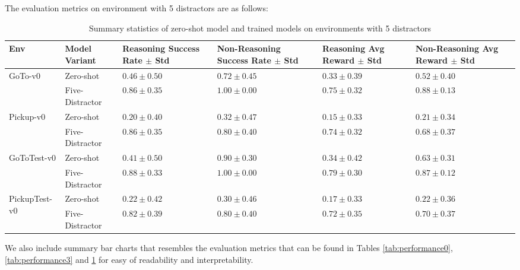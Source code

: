 \documentclass[11pt,a4paper]{article}
\begin{document}
The evaluation metrics on environment with 5 distractors are as follows:
\begin{table}[htbp]
\centering
\scriptsize
\begin{tabularx}{\linewidth}{%
    l l
    >{\centering\arraybackslash}X 
    >{\centering\arraybackslash}X 
    >{\centering\arraybackslash}X 
    >{\centering\arraybackslash}X }
\toprule
\textbf{Env} & \textbf{Model Variant} 
& \textbf{Reasoning Success Rate $\pm$ Std} 
& \textbf{Non-Reasoning Success Rate $\pm$ Std} 
& \textbf{Reasoning Avg Reward $\pm$ Std} 
& \textbf{Non-Reasoning Avg Reward $\pm$ Std} \\
\midrule
\multirow{2}{*}{GoTo-v0} 
    & Zero-shot                & $0.46\pm0.50$ & $0.72\pm0.45$ & $0.33\pm0.39$ & $0.52\pm0.40$ \\
    & Five-Distractor          & $0.86\pm0.35$ & $1.00\pm0.00$ & $0.75\pm0.32$ & $0.88\pm0.13$ \\
\midrule
\multirow{2}{*}{Pickup-v0} 
    & Zero-shot                & $0.20\pm0.40$ & $0.32\pm0.47$ & $0.15\pm0.33$ & $0.21\pm0.34$ \\
    & Five-Distractor          & $0.86\pm0.35$ & $0.80\pm0.40$ & $0.74\pm0.32$ & $0.68\pm0.37$ \\
\midrule
\multirow{2}{*}{GoToTest-v0} 
    & Zero-shot                & $0.41\pm0.50$ & $0.90\pm0.30$ & $0.34\pm0.42$ & $0.63\pm0.31$ \\
    & Five-Distractor          & $0.88\pm0.33$ & $1.00\pm0.00$ & $0.79\pm0.30$ & $0.87\pm0.12$ \\
\midrule
\multirow{2}{*}{PickupTest-v0} 
    & Zero-shot                & $0.22\pm0.42$ & $0.30\pm0.46$ & $0.17\pm0.33$ & $0.22\pm0.36$ \\
    & Five-Distractor          & $0.82\pm0.39$ & $0.80\pm0.40$ & $0.72\pm0.35$ & $0.70\pm0.37$ \\
\bottomrule
\end{tabularx}
\caption{Summary statistics of zero-shot model and trained models on environments with 5 distractors}
\label{tab:performance5}
\end{table}

We also include summary bar charts that resembles the evaluation metrics that can be found in Tables \ref{tab:performance0}, \ref{tab:performance3} and \ref{tab:performance5} for easy of readability and interpretability.
\end{document}
